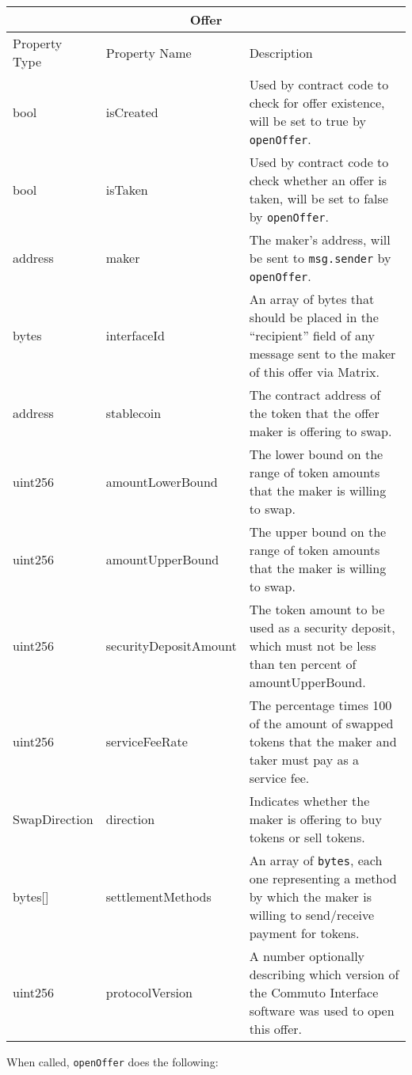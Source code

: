\documentclass[11pt]{article}
\begin{document}
    \begin{longtable}[p]{ |p{2.5cm}|p{4cm}|p{7cm}| }
    \hline
    \multicolumn{3}{|c|}{Offer} \\
    \hline
    Property Type & Property Name & Description \\
    \hline
    bool & isCreated & Used by contract code to check for offer existence, will be set to true
    by \verb|openOffer|. \\
    bool & isTaken & Used by contract code to check whether an offer is taken, will be set to
    false by \verb|openOffer|. \\
    address & maker & The maker's address, will be sent to \verb|msg.sender| by \verb|openOffer|. \\
    bytes & interfaceId & An array of bytes that should be placed in the ``recipient'' field of any
    message sent to the maker of this offer via Matrix. \\
    address & stablecoin & The contract address of the token that the offer maker is offering to
    swap. \\
    uint256 & amountLowerBound & The lower bound on the range of token amounts that the maker is
    willing to swap. \\
    uint256 & amountUpperBound & The upper bound on the range of token amounts that the maker is
    willing to swap. \\
    uint256 & securityDepositAmount & The token amount to be used as a security deposit, which must
    not be less than ten percent of amountUpperBound. \\
    uint256 & serviceFeeRate & The percentage times 100 of the amount of swapped tokens that the
    maker and taker must pay as a service fee. \\
    SwapDirection & direction & Indicates whether the maker is offering to buy tokens or sell
    tokens. \\
    bytes[] & settlementMethods & An array of \verb|bytes|, each one representing a method by which
    the maker is willing to send/receive payment for tokens. \\
    uint256 & protocolVersion & A number optionally describing which version of the Commuto
    Interface software was used to open this offer. \\
        \hline
    \end{longtable}

    \pagebreak
    When called, \verb|openOffer| does the following: \\
\end{document}

